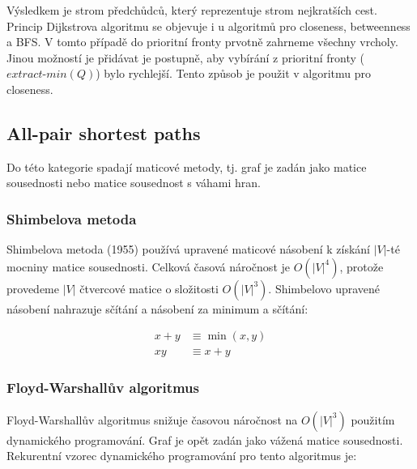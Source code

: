 \documentclass{bakalarka}
\begin{document}
Výsledkem je strom předchůdců, který reprezentuje strom nejkratších cest.
Princip Dijkstrova algoritmu se objevuje i u algoritmů pro closeness,
betweenness a BFS. V tomto případě do prioritní fronty prvotně zahrneme všechny
vrcholy. Jinou možností je přidávat je postupně, aby vybírání z prioritní
fronty ($extract\mbox{-}min(Q)$) bylo rychlejší. Tento způsob je použit v
algoritmu pro closeness.


\subsection{All-pair shortest paths}
Do této kategorie spadají maticové metody, tj. graf je zadán jako matice
sousednosti nebo matice sousednost s váhami hran.


\subsubsection{Shimbelova metoda}
Shimbelova metoda (1955) používá upravené maticové násobení k získání $|V|$-té
mocniny matice sousednosti. Celková časová náročnost je $O(|V|^4)$, protože
provedeme $|V|$  čtvercové matice o složitosti $O(|V|^3)$.
Shimbelovo upravené násobení nahrazuje sčítání a násobení za minimum a sčítání:

\begin{align*}
x + y &\equiv \min(x, y) \\
xy &\equiv x + y
\end{align*}

\subsubsection{Floyd-Warshallův algoritmus}
Floyd-Warshallův algoritmus snižuje časovou náročnost na $O(|V|^3)$
použitím dynamického programování. Graf je opět zadán jako vážená matice
sousednosti. Rekurentní vzorec dynamického programování pro tento algoritmus je:
\end{document}
